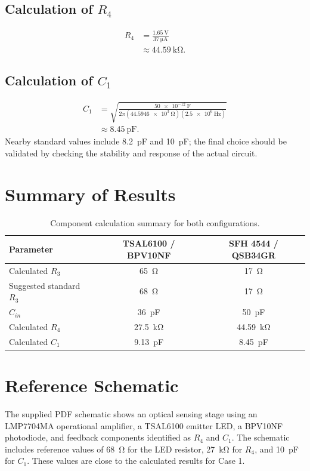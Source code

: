 \documentclass[12pt,a4paper]{article}
\begin{document}
\subsection{Calculation of $R_4$}
\begin{align}
  R_4 &= \frac{\SI{1.65}{\volt}}{\SI{37}{\micro\ampere}}\\
      &\approx \boxed{\SI{44.59}{\kilo\ohm}}.
\end{align}

\subsection{Calculation of $C_1$}
\begin{align}
 C_1 &=
 \sqrt{\frac{\SI{50e-12}{\farad}}
 {2\pi(\SI{44.5946e3}{\ohm})(\SI{2.5e6}{\hertz})}}\\
 &\approx \boxed{\SI{8.45}{\pico\farad}}.
\end{align}
Nearby standard values include \SI{8.2}{\pico\farad} and
\SI{10}{\pico\farad}; the final choice should be validated by checking
the stability and response of the actual circuit.

\section{Summary of Results}
\begin{table}[h!]
\centering
\begin{tabular}{lcc}
\toprule
Parameter & TSAL6100 / BPV10NF & SFH 4544 / QSB34GR\\
\midrule
Calculated $R_3$ & \SI{65}{\ohm} & \SI{17}{\ohm}\\
Suggested standard $R_3$ & \SI{68}{\ohm} & \SI{17}{\ohm}\\
$C_{in}$ & \SI{36}{\pico\farad} & \SI{50}{\pico\farad}\\
Calculated $R_4$ & \SI{27.5}{\kilo\ohm} & \SI{44.59}{\kilo\ohm}\\
Calculated $C_1$ & \SI{9.13}{\pico\farad} & \SI{8.45}{\pico\farad}\\
\bottomrule
\end{tabular}
\caption{Component calculation summary for both configurations.}
\end{table}

\section{Reference Schematic}
The supplied PDF schematic shows an optical sensing stage using an
LMP7704MA operational amplifier, a TSAL6100 emitter LED, a BPV10NF
photodiode, and feedback components identified as $R_4$ and $C_1$.
The schematic includes reference values of \SI{68}{\ohm} for the LED
resistor, \SI{27}{\kilo\ohm} for $R_4$, and \SI{10}{\pico\farad} for
$C_1$. These values are close to the calculated results for Case 1.
\end{document}
